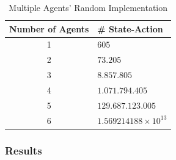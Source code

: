 \documentclass[a4paper,11pt]{article}
\begin{document}
\begin{table}[h]
\begin{center}
\caption{Multiple Agents' Random Implementation}
\begin{tabular}{c l} 
\hline\hline               
\textbf{\small{Number of Agents}} & \textbf{\small{\# State-Action}} \\  
\hline
1 & $605$\\ 
2 & $73.205$\\
3 & $8.857.805$\\
4 & $1.071.794.405$\\
5 & $129.687.123.005$\\
6 & $1.569214188 \times 10^{13}$\\
\end{tabular}
\label{table:complexity} 
\end{center} 
\end{table} 




\newpage

\subsubsection{Results}
\end{document}
